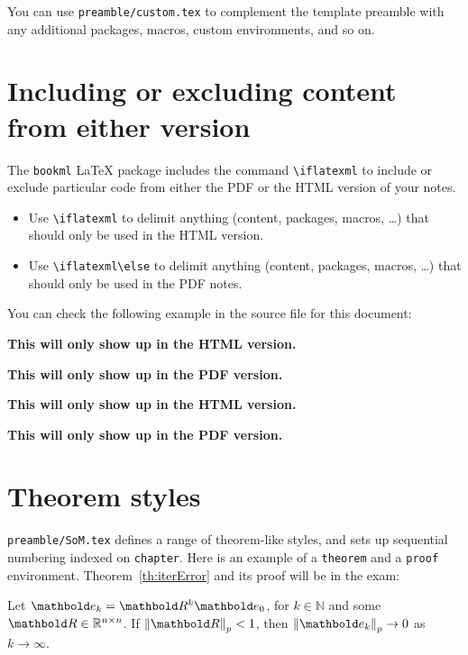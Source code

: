 You can use \texttt{preamble/custom.tex} to complement the template preamble with any additional packages, macros, custom environments, and so on.


\section{Including or excluding content from either version}
\label{demo:ifpdf}

The \texttt{bookml} \LaTeX{} package includes the command \verb|\iflatexml| to include or exclude particular code from either the PDF or the HTML version of your notes.

\begin{itemize}
    \item Use \verb|\iflatexml| to delimit anything (content, packages, macros, \ldots) that should only be used in the HTML version.
    \item Use \verb|\iflatexml\else| to delimit anything (content, packages, macros, \ldots) that should only be used in the PDF notes.
\end{itemize}

You can check the following example in the source file for this document:

\iflatexml
  \textbf{This will only show up in the HTML version.}
\fi

\iflatexml
\else
  \textbf{This will only show up in the PDF version.}
\fi

\begin{snippet}
\iflatexml
  \textbf{This will only show up in the HTML version.}
\fi

\iflatexml
\else
  \textbf{This will only show up in the PDF version.}
\fi
\end{snippet}




\section{Theorem styles}
\label{demo:thm}

\texttt{preamble/SoM.tex} defines a range of theorem-like styles, and sets up sequential numbering indexed on \texttt{chapter}. Here is an example of a \texttt{theorem} and a \texttt{proof} environment.
Theorem~\ref{th:iterError} and its proof will be in the exam:

\begin{theorem}
  \label{th:iterError}
  Let $\vect{e}_k = \mat{R}^k \vect{e}_0$, for $k\in \mathbb{N}$ and some $\mat{R}\in \R^{n\times n}$. If $\norm{\mat{R}}_p < 1$, then \mbox{$\norm{\vect{e}_k}_p \to 0$} as $k \to \infty$.
\end{theorem}

